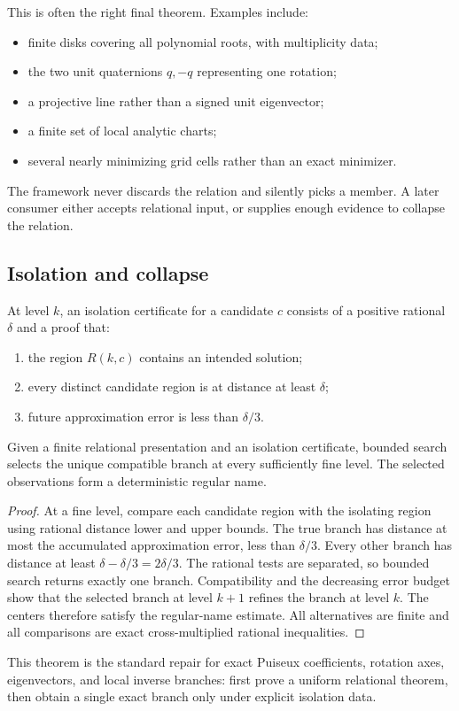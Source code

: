 This is often the right final theorem.  Examples include:
\begin{itemize}[leftmargin=1.6em]
\item finite disks covering all polynomial roots, with multiplicity data;
\item the two unit quaternions \(q,-q\) representing one rotation;
\item a projective line rather than a signed unit eigenvector;
\item a finite set of local analytic charts;
\item several nearly minimizing grid cells rather than an exact minimizer.
\end{itemize}

The framework never discards the relation and silently picks a member.  A
later consumer either accepts relational input, or supplies enough evidence
to collapse the relation.

\subsection{Isolation and collapse}

\begin{definition}
At level \(k\), an isolation certificate for a candidate \(c\) consists of a
positive rational \(\delta\) and a proof that:
\begin{enumerate}[label=(\roman*)]
\item the region \(R(k,c)\) contains an intended solution;
\item every distinct candidate region is at distance at least \(\delta\);
\item future approximation error is less than \(\delta/3\).
\end{enumerate}
\end{definition}

\begin{theorem}
Given a finite relational presentation and an isolation certificate, bounded
search selects the unique compatible branch at every sufficiently fine
level.  The selected observations form a deterministic regular name.
\end{theorem}

\begin{proof}
At a fine level, compare each candidate region with the isolating region
using rational distance lower and upper bounds.  The true branch has distance
at most the accumulated approximation error, less than \(\delta/3\).
Every other branch has distance at least
\(\delta-\delta/3=2\delta/3\).  The rational tests are separated, so bounded
search returns exactly one branch.  Compatibility and the decreasing error
budget show that the selected branch at level \(k+1\) refines the branch at
level \(k\).  The centers therefore satisfy the regular-name estimate.
All alternatives are finite and all comparisons are exact cross-multiplied
rational inequalities.
\end{proof}

This theorem is the standard repair for exact Puiseux coefficients, rotation
axes, eigenvectors, and local inverse branches: first prove a uniform
relational theorem, then obtain a single exact branch only under explicit
isolation data.
